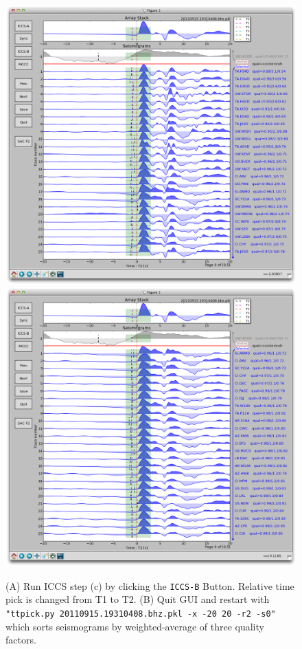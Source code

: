 \documentclass[12pt, titlepage]{article}
\begin{document}
\begin{figure}[!h]
    \centering
        \vspace{3em}
    \includegraphics[width = 0.494 \textwidth]{figs/snapshots/ttpick-r2-s1.png}
    \includegraphics[width = 0.494 \textwidth]{figs/snapshots/ttpick-r2-s0.png}
    \caption{
    (A) Run ICCS step (c) by clicking the \texttt{ICCS-B} Button. Relative time pick is changed from T1 to T2.
    (B) Quit GUI and restart with \texttt{"ttpick.py 20110915.19310408.bhz.pkl -x -20 20 -r2 -s0"} which sorts seismograms by weighted-average of three quality factors. 
    }
    \label{fig:ttpick2}
\end{figure}
\end{document}
